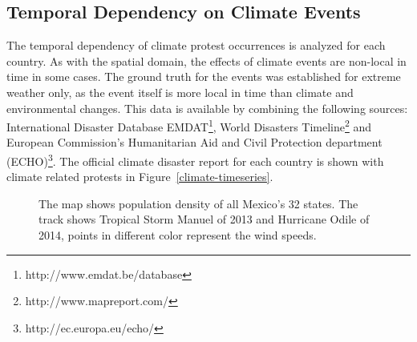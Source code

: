\subsection{Temporal Dependency on Climate Events}
The temporal dependency of climate protest occurrences is analyzed for each country.
As with the spatial domain, the effects of climate events are non-local in time in some cases.
The ground truth for the events was established for extreme weather only, as the event itself is more local in time than climate and environmental changes.
This data is available by combining the following sources: International Disaster Database EMDAT\footnote{http://www.emdat.be/database}, World Disasters Timeline\footnote{http://www.mapreport.com/} and European Commission's Humanitarian Aid and Civil Protection department (ECHO)\footnote{http://ec.europa.eu/echo/}.
The official climate disaster report for each country is shown with climate related protests in Figure~\ref{climate-timeseries}.



\begin{figure}[t]
	\centering
	\caption{The map shows population density of all Mexico's 32 states. The track shows Tropical Storm Manuel of 2013 and Hurricane Odile of 2014, points in different color represent the wind speeds. }
\label{Mexico-track-map}
\end{figure}



